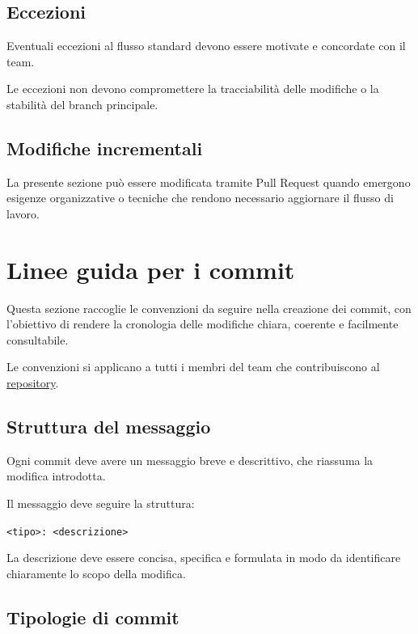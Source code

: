 \documentclass[11pt, a4paper]{article}
\begin{document}
\subsection{Eccezioni}

Eventuali eccezioni al flusso standard devono essere motivate e concordate con il team.

Le eccezioni non devono compromettere la tracciabilità delle modifiche o la stabilità del branch principale.

\subsection{Modifiche incrementali}

La presente sezione può essere modificata tramite Pull Request quando emergono esigenze organizzative o tecniche che rendono necessario aggiornare il flusso di lavoro.

\section{Linee guida per i commit}
\label{sec:linee-guida-per-i-commit}

Questa sezione raccoglie le convenzioni da seguire nella creazione dei commit, con l'obiettivo di rendere la cronologia delle modifiche chiara, coerente e facilmente consultabile.

Le convenzioni si applicano a tutti i membri del team che contribuiscono al \href{https://github.com/On-By-One-Team/On-By-One.github.io}{repository}.

\subsection{Struttura del messaggio}

Ogni commit deve avere un messaggio breve e descrittivo, che riassuma la modifica introdotta.

Il messaggio deve seguire la struttura:

\noindent \texttt{<tipo>: <descrizione>}

La descrizione deve essere concisa, specifica e formulata in modo da identificare chiaramente lo scopo della modifica.

\subsection{Tipologie di commit}
\end{document}
